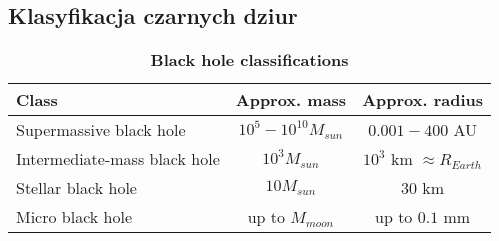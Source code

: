 \documentclass[12pt]{article}
\begin{document}
\subsection{Klasyfikacja czarnych dziur}

\begin{table}
\caption{\textbf{Black hole classifications}}
\begin{center}
\renewcommand{\arraystretch}{2}
\begin{tabular}{|l|c|c|}
\hline
\textbf{Class} & \textbf{Approx. mass} & \textbf{Approx. radius} \\
\hline
Supermassive black hole & $10^5-10^{10} M_{sun}$ & $0.001-400$ AU \\
\hline
Intermediate-mass black hole & $10^3 M_{sun}$ & $10^3$ km $\approx R_{Earth}$  \\
\hline
Stellar black hole & $10 M_{sun}$ & $30$ km \\
\hline
Micro black hole & up to $M_{moon}$ & up to $0.1$ mm \\
\hline
\end{tabular}
\end{center}
\end{table}
 
\end{document}
